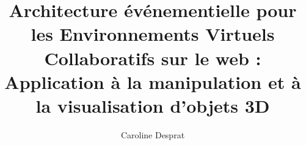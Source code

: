 \documentclass[final,12pt,oneside]{book}
\title{Architecture événementielle pour les Environnements Virtuels 
	Collaboratifs 
	sur le web : Application à la manipulation et à la 
	visualisation d'objets 3D}
\author{Caroline Desprat}
\begin{document}
	
	\frontmatter
	\dominitoc
	\completetable
	
	\mainmatter

%

%











\backmatter

\completelist
\singlespacing

%	

\end{document}
